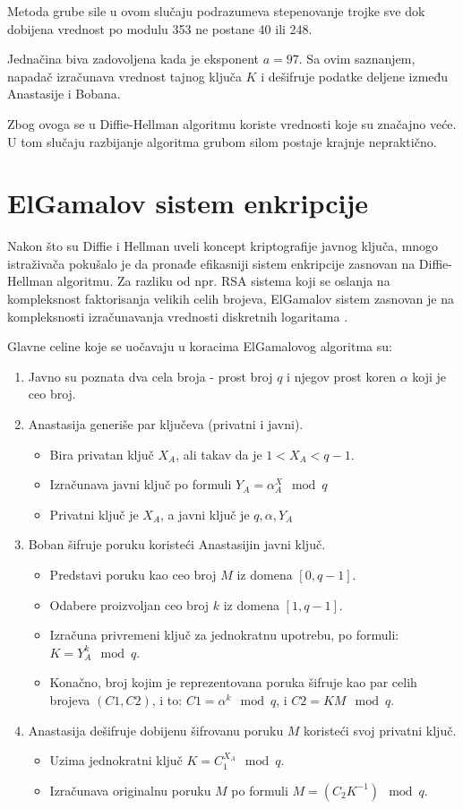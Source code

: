 \documentclass[a4paper]{article}
\begin{document}
Metoda grube sile u ovom slučaju podrazumeva stepenovanje trojke sve dok dobijena vrednost po modulu 353 ne postane 40 ili 248.

Jednačina biva zadovoljena kada je eksponent $a=97$. Sa ovim saznanjem, napadač izračunava vrednost tajnog ključa $K$ i dešifruje podatke deljene između Anastasije i Bobana.

Zbog ovoga se u Diffie-Hellman algoritmu koriste vrednosti koje su značajno veće. U tom slučaju razbijanje algoritma grubom silom postaje krajnje nepraktično.
 
\section{ElGamalov sistem enkripcije}
\label{sec:Elgamal}
Nakon što su Diffie i Hellman uveli koncept kriptografije javnog ključa, mnogo istraživača pokušalo je da pronađe efikasniji sistem enkripcije zasnovan na Diffie-Hellman algoritmu. Za razliku od npr. RSA sistema \cite{dhpaper} koji se oslanja na kompleksnost faktorisanja velikih celih brojeva, ElGamalov sistem zasnovan je na kompleksnosti izračunavanja vrednosti diskretnih logaritama \cite{elgamal}.

Glavne celine koje se uočavaju u koracima ElGamalovog algoritma su:
\begin{enumerate}
    \item Javno su poznata dva cela broja - prost broj $q$ i njegov prost koren $\alpha$ koji je ceo broj.
    \item Anastasija generiše par ključeva (privatni i javni).\begin{itemize}
        \item Bira privatan ključ $X_A$, ali takav da je $1<X_A<q-1$.
        \item Izračunava javni ključ po formuli $Y_A=\alpha^X_A\mod q$
        \item Privatni ključ je $X_A$, a javni ključ je ${q,\alpha,Y_A}$
    \end{itemize}
    \item Boban šifruje poruku koristeći Anastasijin javni ključ.\begin{itemize}
        \item Predstavi poruku kao ceo broj $M$ iz domena $[0,q-1]$.
        \item Odabere proizvoljan ceo broj $k$ iz domena $[1,q-1]$.
        \item Izračuna privremeni ključ za jednokratnu upotrebu, po formuli: $K=Y_A^k\mod q$.
        \item Konačno, broj kojim je reprezentovana poruka šifruje kao par celih brojeva $(C1,C2)$, i to: $C1=\alpha^k \mod q$, i $C2=KM\mod q$.
    \end{itemize}
    \item Anastasija dešifruje dobijenu šifrovanu poruku $M$ koristeći svoj privatni ključ.\begin{itemize}
        \item Uzima jednokratni ključ $K=C_1^{X_A}\mod q$.
        \item Izračunava originalnu poruku $M$ po formuli $M=(C_2K^{-1})\mod q$.
    \end{itemize}
\end{enumerate}
\end{document}

